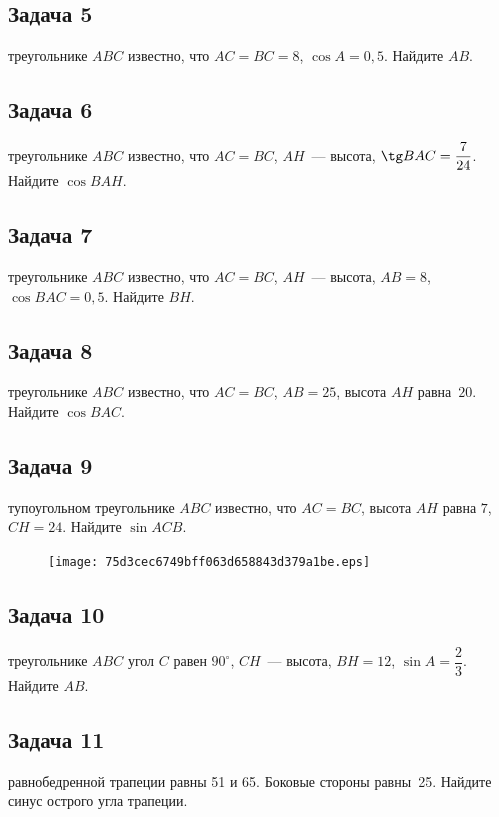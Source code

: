 \documentclass[a4paper,10pt]{article} %
\begin{document}
\begin{spacing}{1.0}
{\subsection*{Задача 5}
 треугольнике $ABC$ известно, что ${AC=BC=8}$, $\cos A=0,5$. Найдите $AB$.

\vspace{1.5cm}

\subsection*{Задача 6}
 треугольнике $ABC$ известно, что ${AC=BC}$, $AH$~--- высота, ${\tg BAC=\dfrac{7}{24}}$. Найдите $\cos BAH$.

\subsection*{Задача 7}
 треугольнике $ABC$ известно, что ${AC=BC}$, $AH$~--- высота, $AB=8$, ${\cos BAC=0,5}$. Найдите $BH$.

\subsection*{Задача 8}
 треугольнике $ABC$ известно, что ${AC=BC}$, $AB=25$, высота $AH$ равна~$20$. Найдите $\cos BAC$.

\subsection*{Задача 9}
 тупоугольном треугольнике $ABC$ известно, что ${AC=BC}$, высота $AH$ равна $7$, $CH=24$. Найдите $\sin ACB$.

\begin{figure}{\texttt{[image: 75d3cec6749bff063d658843d379a1be.eps]}}\end{figure}
\subsection*{Задача 10}
 треугольнике $ABC$ угол $C$ равен $90^\circ$, $CH$~--- высота, $BH=12$, $\sin A=\dfrac{2}{3}$. Найдите $AB$.

\vspace{1cm}

\subsection*{Задача 11}
 равнобедренной трапеции равны 51 и 65. Боковые стороны равны~25. Найдите синус острого угла трапеции.

}
\end{spacing}
\end{document}
